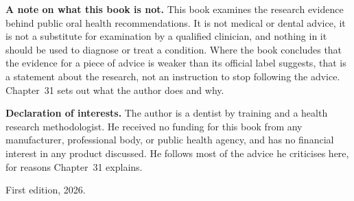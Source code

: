 {\noindent \textbf{A note on what this book is not.} This book examines the
research evidence behind public oral health recommendations. It is not medical
or dental advice, it is not a substitute for examination by a qualified
clinician, and nothing in it should be used to diagnose or treat a condition.
Where the book concludes that the evidence for a piece of advice is weaker than
its official label suggests, that is a statement about the research, not an
instruction to stop following the advice. Chapter~31 sets out what the author
does and why.\par
\medskip

\noindent \textbf{Declaration of interests.} The author is a dentist by
training and a health research methodologist. He received no funding for this
book from any manufacturer, professional body, or public health agency, and has
no financial interest in any product discussed. He follows most of the advice
he criticises here, for reasons Chapter~31 explains.\par
\medskip

\noindent First edition, 2026.\par

}
\vfill
\cleardoublepage
